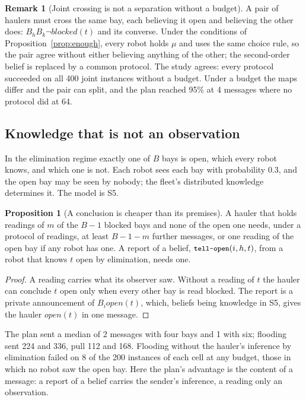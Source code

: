\documentclass[11pt,a4paper]{article}
\theoremstyle{definition}
\newtheorem{proposition}{Proposition}
\newtheorem{remark}{Remark}
\newcommand{\Bop}[1]{B_{#1}}
\newcommand{\code}[1]{\texttt{\small #1}}
\newcommand{\blocked}{\mathit{blocked}}
\newcommand{\merged}{\mu}
\begin{document}
\begin{remark}[Joint crossing is not a separation without a budget]
A pair of haulers must cross the same bay, each believing it open and believing
the other does: $\Bop{h}\Bop{k}\neg\blocked(t)$ and its converse. Under the
conditions of Proposition~\ref{prop:enough}, every robot holds $\merged$ and uses the
same choice rule, so the pair agree without either believing anything of the
other; the second-order belief is replaced by a common protocol. The study agrees:
every protocol succeeded on all 400 joint instances without a budget. Under a
budget the maps differ and the pair can split, and the plan reached 95\% at 4
messages where no protocol did at 64.
\end{remark}

\subsection{Knowledge that is not an observation}

In the elimination regime exactly one of $B$ bays is open, which every robot
knows, and which one is not. Each robot sees each bay with probability 0.3, and
the open bay may be seen by nobody; the fleet's distributed
knowledge~\cite{fhmv1995} determines it. The model is S5.

\begin{proposition}[A conclusion is cheaper than its premises]
\label{prop:elim}
A hauler that holds readings of $m$ of the $B - 1$ blocked bays and none of the
open one needs, under a protocol of readings, at least $B - 1 - m$ further
messages, or one reading of the open bay if any robot has one. A report of a
belief, $\code{tell-open}(i, h, t)$, from a robot that knows $t$ open by
elimination, needs one.
\end{proposition}

\begin{proof}
A reading carries what its observer saw. Without a reading of $t$ the hauler can
conclude $t$ open only when every other bay is read blocked. The report is a private
announcement of $\Bop{i}\mathit{open}(t)$, which, beliefs being knowledge in S5,
gives the hauler $\mathit{open}(t)$ in one message.
\end{proof}

The plan sent a median of 2 messages with four bays and 1 with six; flooding sent
224 and 336, pull 112 and 168. Flooding without the hauler's inference by
elimination failed on 8 of the 200 instances of each cell at any budget, those in
which no robot saw the open bay. Here the plan's advantage is the content of a message: a report of a
belief carries the sender's inference, a reading only an observation.
\end{document}
